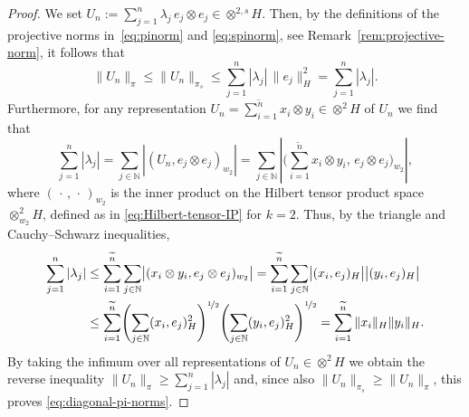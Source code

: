 \documentclass[reqno]{amsart}
\numberwithin{equation}{section}
\newcommand{\bbN}{\mathbb{N}}
\newcommand{\norm}[2]{     \| #1       \|_{ #2 }}
\newcommand{\scalar}[2]{     ( #1       )_{ #2 }}
\theoremstyle{remark}
\theoremstyle{definition}
\begin{document}
\begin{proof} 
	We set 
	$U_n := \sum_{j=1}^n \lambda_j \, e_j\otimes e_j \in \otimes^{2,s} H$.  
	Then, by the definitions of the projective norms 
	in~\eqref{eq:pinorm} and \eqref{eq:spinorm}, 
	see Remark~\ref{rem:projective-norm}, 
	it follows that 
	\[
		\norm{ U_n }{\pi} 
		\leq  
		\norm{ U_n }{\pi_s} 
		\leq 
		\sum_{j=1}^n |\lambda_j| \, \norm{e_j}{H}^2 
		= 
		\sum_{j=1}^n |\lambda_j|. 
	\]
	Furthermore, 
	for any representation 
	$U_n = \sum_{i=1}^{\widetilde{n}} x_i \otimes y_i \in \otimes^2 H$ 
	of $U_n$ 
	we find that 
	\[ 
		\sum_{j=1}^n 
		| \lambda_j | 
		= 
		\sum_{j\in\bbN}
		| \scalar{ U_n , e_j \otimes e_j}{w_2} | 
		= 
		\sum_{j\in\bbN} 
		\left| 
		\biggl( 
		\sum_{i=1}^{\widetilde{n}} x_i \otimes y_i ,\, e_j \otimes e_j 
		\biggr)_{\!w_2} 
		\right|, 
	\]
	where $\scalar{\,\cdot\,, \,\cdot\,}{w_2}$ 
	is the inner product on the Hilbert tensor 
	product space~$\otimes^2_{w_2} H$,   
	defined as in \eqref{eq:Hilbert-tensor-IP} 
	for $k=2$. 
	Thus, by the triangle and Cauchy--Schwarz inequalities, 
	\begin{align*} 
		\sum_{j=1}^n 
		| \lambda_j | 
		&\leq 
		\sum_{i=1}^{\widetilde{n}}
		\sum_{j\in\bbN} 
		\bigl| \scalar{ x_i\otimes y_i , e_j\otimes e_j}{w_2} \bigr| 
		= 
		\sum_{i=1}^{\widetilde{n}}
		\sum_{j\in\bbN} 
		\bigl| \scalar{ x_i, e_j}{H} \bigr|  \bigl| \scalar{ y_i , e_j }{H} \bigr| 
		\\
		&\leq 
		\sum_{i=1}^{\widetilde{n}}
		\Biggl( \sum_{j\in\bbN} 
		\scalar{ x_i, e_j}{H}^2 
		\Biggr)^{\nicefrac{1}{2}} 
		\Biggl( \sum_{j\in\bbN} 
		\scalar{ y_i, e_j}{H}^2 
		\Biggr)^{\nicefrac{1}{2}} 
		= 
		\sum_{i=1}^{\widetilde{n}}
		\norm{x_i}{H}
		\norm{y_i}{H} . 
	\end{align*} 
	By taking the infimum over all representations of $U_n \in \otimes^2 H$ 
	we obtain the reverse inequality 
	$\norm{ U_n }{\pi}\geq \sum_{j=1}^n |\lambda_j|$ and, 
	since also $\norm{ U_n }{\pi_s} \geq \norm{ U_n }{\pi}$, 
	this proves \eqref{eq:diagonal-pi-norms}. 
	

\end{proof}
\end{document}
